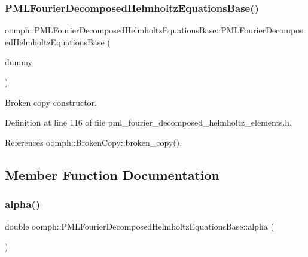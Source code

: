 \subsubsection{\texorpdfstring{P\+M\+L\+Fourier\+Decomposed\+Helmholtz\+Equations\+Base()}{PMLFourierDecomposedHelmholtzEquationsBase()}\hspace{0.1cm}{\footnotesize\ttfamily [2/2]}}
{\footnotesize\ttfamily oomph\+::\+P\+M\+L\+Fourier\+Decomposed\+Helmholtz\+Equations\+Base\+::\+P\+M\+L\+Fourier\+Decomposed\+Helmholtz\+Equations\+Base (\begin{DoxyParamCaption}\item[{const \hyperlink{classoomph_1_1PMLFourierDecomposedHelmholtzEquationsBase}{P\+M\+L\+Fourier\+Decomposed\+Helmholtz\+Equations\+Base} \&}]{dummy }\end{DoxyParamCaption})\hspace{0.3cm}{\ttfamily [inline]}}



Broken copy constructor. 



Definition at line 116 of file pml\+\_\+fourier\+\_\+decomposed\+\_\+helmholtz\+\_\+elements.\+h.



References oomph\+::\+Broken\+Copy\+::broken\+\_\+copy().



\subsection{Member Function Documentation}
\mbox{\label{classoomph_1_1PMLFourierDecomposedHelmholtzEquationsBase_a542387db09b5edf390be1f5c9a28b4d5}} 
\subsubsection{\texorpdfstring{alpha()}{alpha()}}
{\footnotesize\ttfamily double oomph\+::\+P\+M\+L\+Fourier\+Decomposed\+Helmholtz\+Equations\+Base\+::alpha (\begin{DoxyParamCaption}{ }\end{DoxyParamCaption})\hspace{0.3cm}{\ttfamily [inline]}}



